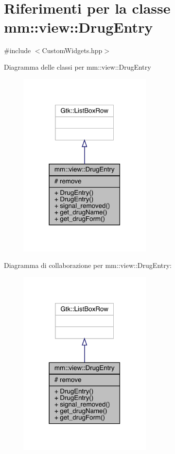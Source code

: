 \hypertarget{classmm_1_1view_1_1_drug_entry}{}\section{Riferimenti per la classe mm\+:\+:view\+:\+:Drug\+Entry}
\label{classmm_1_1view_1_1_drug_entry}


{\ttfamily \#include $<$Custom\+Widgets.\+hpp$>$}



Diagramma delle classi per mm\+:\+:view\+:\+:Drug\+Entry
\nopagebreak
\begin{figure}[H]
\begin{center}
\leavevmode
\includegraphics[width=189pt]{d6/d98/classmm_1_1view_1_1_drug_entry__inherit__graph}
\end{center}
\end{figure}


Diagramma di collaborazione per mm\+:\+:view\+:\+:Drug\+Entry\+:
\nopagebreak
\begin{figure}[H]
\begin{center}
\leavevmode
\includegraphics[width=189pt]{d7/dc4/classmm_1_1view_1_1_drug_entry__coll__graph}
\end{center}
\end{figure}

